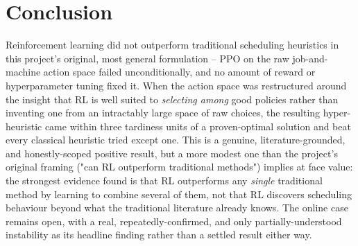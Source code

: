 \documentclass[12pt]{article}
\begin{document}
\section{Conclusion}
Reinforcement learning did not outperform traditional scheduling heuristics in this project's original, most general formulation -- PPO on the raw job-and-machine action space failed unconditionally, and no amount of reward or hyperparameter tuning fixed it. When the action space was restructured around the insight that RL is well suited to \emph{selecting among} good policies rather than inventing one from an intractably large space of raw choices, the resulting hyper-heuristic came within three tardiness units of a proven-optimal solution and beat every classical heuristic tried except one. This is a genuine, literature-grounded, and honestly-scoped positive result, but a more modest one than the project's original framing ("can RL outperform traditional methods") implies at face value: the strongest evidence found is that RL outperforms any \emph{single} traditional method by learning to combine several of them, not that RL discovers scheduling behaviour beyond what the traditional literature already knows. The online case remains open, with a real, repeatedly-confirmed, and only partially-understood instability as its headline finding rather than a settled result either way.
\end{document}
